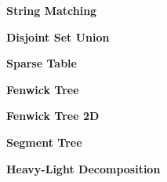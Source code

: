 \documentclass[a4paper, 13pt, twocolumn, landscape]{book}
\begin{document}

  \textbf{String Matching}
  
  
  


  \textbf{Disjoint Set Union}
  
  \textbf{Sparse Table}
  
  \textbf{Fenwick Tree}
  
  \textbf{Fenwick Tree 2D}
  
  \textbf{Segment Tree}
  
  \textbf{Heavy-Light Decomposition}
  
\end{document}
